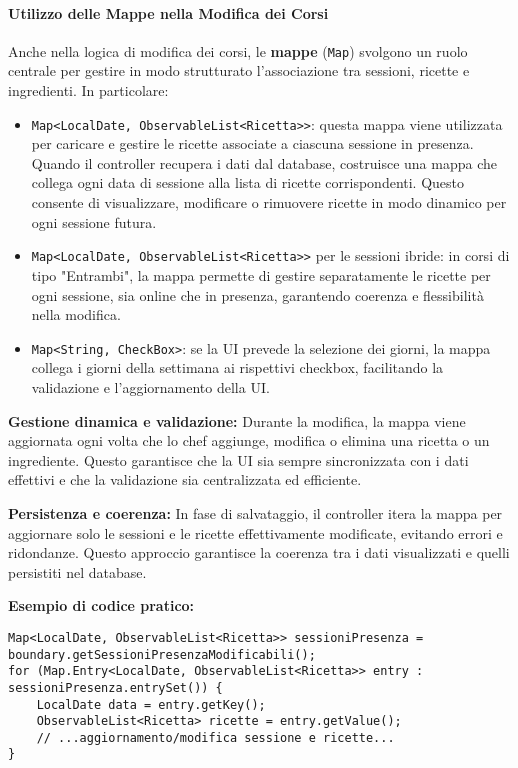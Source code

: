 \paragraph{Utilizzo delle Mappe nella Modifica dei Corsi}
Anche nella logica di modifica dei corsi, le \textbf{mappe} (\texttt{Map}) svolgono un ruolo centrale per gestire in modo strutturato l'associazione tra sessioni, ricette e ingredienti. In particolare:

\begin{itemize}
    \item \texttt{Map<LocalDate, ObservableList<Ricetta>>}: questa mappa viene utilizzata per caricare e gestire le ricette associate a ciascuna sessione in presenza. Quando il controller recupera i dati dal database, costruisce una mappa che collega ogni data di sessione alla lista di ricette corrispondenti. Questo consente di visualizzare, modificare o rimuovere ricette in modo dinamico per ogni sessione futura.
    \item \texttt{Map<LocalDate, ObservableList<Ricetta>>} per le sessioni ibride: in corsi di tipo "Entrambi", la mappa permette di gestire separatamente le ricette per ogni sessione, sia online che in presenza, garantendo coerenza e flessibilità nella modifica.
    \item \texttt{Map<String, CheckBox>}: se la UI prevede la selezione dei giorni, la mappa collega i giorni della settimana ai rispettivi checkbox, facilitando la validazione e l'aggiornamento della UI.
\end{itemize}

\textbf{Gestione dinamica e validazione:} Durante la modifica, la mappa viene aggiornata ogni volta che lo chef aggiunge, modifica o elimina una ricetta o un ingrediente. Questo garantisce che la UI sia sempre sincronizzata con i dati effettivi e che la validazione sia centralizzata ed efficiente.

\textbf{Persistenza e coerenza:} In fase di salvataggio, il controller itera la mappa per aggiornare solo le sessioni e le ricette effettivamente modificate, evitando errori e ridondanze. Questo approccio garantisce la coerenza tra i dati visualizzati e quelli persistiti nel database.

\textbf{Esempio di codice pratico:}
\begin{verbatim}
Map<LocalDate, ObservableList<Ricetta>> sessioniPresenza = boundary.getSessioniPresenzaModificabili();
for (Map.Entry<LocalDate, ObservableList<Ricetta>> entry : sessioniPresenza.entrySet()) {
    LocalDate data = entry.getKey();
    ObservableList<Ricetta> ricette = entry.getValue();
    // ...aggiornamento/modifica sessione e ricette...
}
\end{verbatim}

